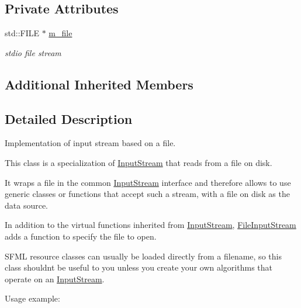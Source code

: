 \subsection*{Private Attributes}
\begin{DoxyCompactItemize}
\item 
\mbox{\label{classsf_1_1_file_input_stream_a163fc63050833b3193190e473aa1420e}} 
std\+::\+F\+I\+LE $\ast$ \mbox{\hyperlink{classsf_1_1_file_input_stream_a163fc63050833b3193190e473aa1420e}{m\+\_\+file}}
\begin{DoxyCompactList}\small\item\em stdio file stream \end{DoxyCompactList}\end{DoxyCompactItemize}
\subsection*{Additional Inherited Members}


\subsection{Detailed Description}
Implementation of input stream based on a file. 

\begin{DoxyVerb}\end{DoxyVerb}


This class is a specialization of \mbox{\hyperlink{classsf_1_1_input_stream}{Input\+Stream}} that reads from a file on disk.

It wraps a file in the common \mbox{\hyperlink{classsf_1_1_input_stream}{Input\+Stream}} interface and therefore allows to use generic classes or functions that accept such a stream, with a file on disk as the data source.

In addition to the virtual functions inherited from \mbox{\hyperlink{classsf_1_1_input_stream}{Input\+Stream}}, \mbox{\hyperlink{classsf_1_1_file_input_stream}{File\+Input\+Stream}} adds a function to specify the file to open.

S\+F\+ML resource classes can usually be loaded directly from a filename, so this class shouldn\textquotesingle{}t be useful to you unless you create your own algorithms that operate on an \mbox{\hyperlink{classsf_1_1_input_stream}{Input\+Stream}}.

Usage example\+: 
\begin{DoxyCode}{0}
\DoxyCodeLine{}
\end{DoxyCode}


